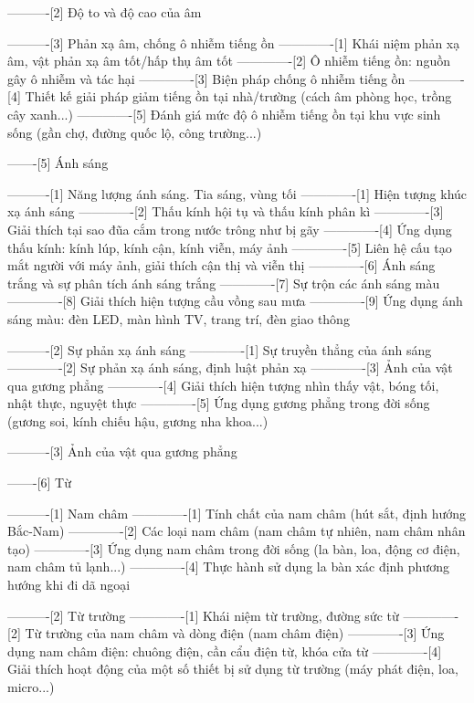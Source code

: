 ----------[2] Độ to và độ cao của âm

----------[3] Phản xạ âm, chống ô nhiễm tiếng ồn
-------------[1] Khái niệm phản xạ âm, vật phản xạ âm tốt/hấp thụ âm tốt
-------------[2] Ô nhiễm tiếng ồn: nguồn gây ô nhiễm và tác hại
-------------[3] Biện pháp chống ô nhiễm tiếng ồn
-------------[4] Thiết kế giải pháp giảm tiếng ồn tại nhà/trường (cách âm phòng học, trồng cây xanh...)
-------------[5] Đánh giá mức độ ô nhiễm tiếng ồn tại khu vực sinh sống (gần chợ, đường quốc lộ, công trường...)

-------[5] Ánh sáng

----------[1] Năng lượng ánh sáng. Tia sáng, vùng tối
-------------[1] Hiện tượng khúc xạ ánh sáng
-------------[2] Thấu kính hội tụ và thấu kính phân kì
-------------[3] Giải thích tại sao đũa cắm trong nước trông như bị gãy
-------------[4] Ứng dụng thấu kính: kính lúp, kính cận, kính viễn, máy ảnh
-------------[5] Liên hệ cấu tạo mắt người với máy ảnh, giải thích cận thị và viễn thị
-------------[6] Ánh sáng trắng và sự phân tích ánh sáng trắng
-------------[7] Sự trộn các ánh sáng màu
-------------[8] Giải thích hiện tượng cầu vồng sau mưa
-------------[9] Ứng dụng ánh sáng màu: đèn LED, màn hình TV, trang trí, đèn giao thông

----------[2] Sự phản xạ ánh sáng
-------------[1] Sự truyền thẳng của ánh sáng
-------------[2] Sự phản xạ ánh sáng, định luật phản xạ
-------------[3] Ảnh của vật qua gương phẳng
-------------[4] Giải thích hiện tượng nhìn thấy vật, bóng tối, nhật thực, nguyệt thực
-------------[5] Ứng dụng gương phẳng trong đời sống (gương soi, kính chiếu hậu, gương nha khoa...)

----------[3] Ảnh của vật qua gương phẳng

-------[6] Từ

----------[1] Nam châm
-------------[1] Tính chất của nam châm (hút sắt, định hướng Bắc-Nam)
-------------[2] Các loại nam châm (nam châm tự nhiên, nam châm nhân tạo)
-------------[3] Ứng dụng nam châm trong đời sống (la bàn, loa, động cơ điện, nam châm tủ lạnh...)
-------------[4] Thực hành sử dụng la bàn xác định phương hướng khi đi dã ngoại

----------[2] Từ trường
-------------[1] Khái niệm từ trường, đường sức từ
-------------[2] Từ trường của nam châm và dòng điện (nam châm điện)
-------------[3] Ứng dụng nam châm điện: chuông điện, cần cẩu điện từ, khóa cửa từ
-------------[4] Giải thích hoạt động của một số thiết bị sử dụng từ trường (máy phát điện, loa, micro...)

